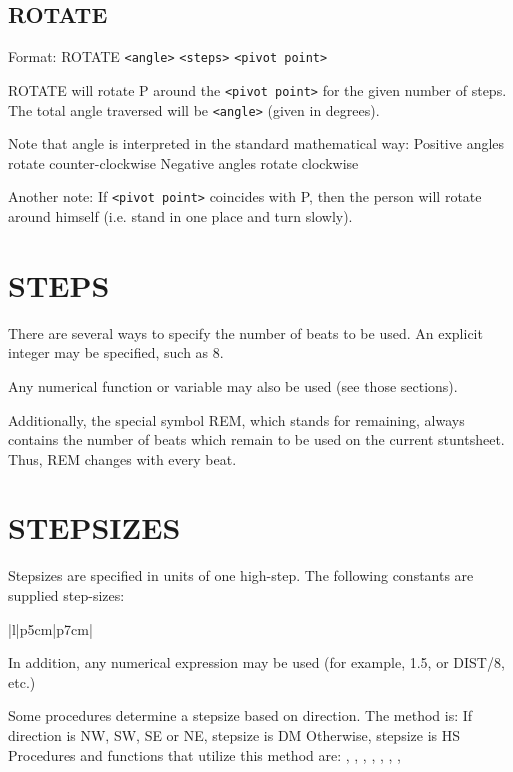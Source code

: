 \subsection{ROTATE}\label{rotate}

Format: ROTATE \verb$<angle>$ \verb$<steps>$ \verb$<pivot point>$

ROTATE will rotate P around the \verb$<pivot point>$ for the given
number of steps.  The total angle traversed will be \verb$<angle>$ (given in
degrees).

Note that angle is interpreted in the standard mathematical way:
  Positive angles rotate counter-clockwise
  Negative angles rotate clockwise

Another note:  If \verb$<pivot point>$ coincides with P, then the person will
rotate around himself (i.e. stand in one place and turn slowly).

\section{STEPS}\label{steps}

There are several ways to specify the number of beats to be used.  An
explicit integer may be specified, such as 8.

Any numerical function or variable may also be used (see those sections).

Additionally, the special symbol REM, which stands for remaining, always
contains the number of beats which remain to be used on the current
stuntsheet.  Thus, REM changes with every beat.

\section{STEPSIZES}\label{stepsizes}

Stepsizes are specified in units of one high-step.  The following constants
are supplied step-sizes:

\begin{tabular}{|l|p{5cm}|p{7cm}|}\hline
{}\hline\hline
{}
\end{tabular}

In addition, any numerical expression may be used (for example, 1.5, or
DIST/8, etc.)

Some procedures determine a stepsize based on direction.  The method is:
  If direction is NW, SW, SE or NE, stepsize is DM
  Otherwise,                        stepsize is HS
Procedures and functions that utilize this method are:
  , ,
, ,
, , ,


